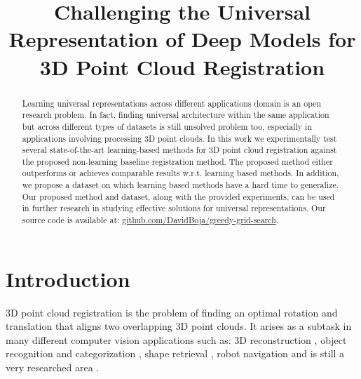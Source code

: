 \documentclass{bmvc2k}
\title{Challenging the Universal Representation of Deep Models for 3D Point Cloud Registration}
\begin{document}
\maketitle

\begin{abstract}
Learning universal representations across different applications domain is an open research problem. In fact, finding universal architecture within the same application but across different types of datasets is still unsolved problem too, especially in applications involving processing 3D point clouds. In this work we experimentally test several state-of-the-art learning-based methods for 3D point cloud registration against the proposed non-learning baseline registration method. The proposed method either outperforms or achieves comparable results w.r.t. learning based methods. In addition, we propose a dataset on which learning based methods have a hard time to generalize.  Our proposed method and dataset, along with the provided experiments, can be used in further research in studying effective solutions for universal representations. Our source code is available at: \url{github.com/DavidBoja/greedy-grid-search}.
\end{abstract}




\section{Introduction}

3D point cloud registration is the problem of finding an optimal rotation and translation that aligns two overlapping 3D point clouds. 
It arises as a subtask in many different computer vision applications such as: 3D reconstruction \cite{3Dreconstruction_reference1,3Dreconstruction_reference2,3Dreconstruction_reference3}, object recognition and categorization \cite{SHOT,RoPS,object_recognition_reference}, shape retrieval \cite{shape_retrieval_reference}, robot navigation \cite{robot_navigation_reference1} and is still a very researched area \cite{comprehensive-survey,3d-registration-review}.
\end{document}
